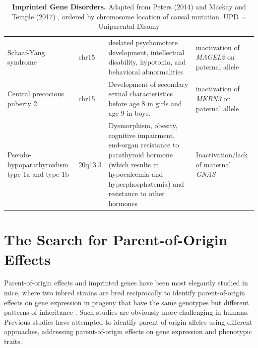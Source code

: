 \begin{table}[!htb]
\begin{adjustbox}{width=1\textwidth}
\begin{tabular}{@{}p{3cm}p{2cm}p{7cm}p{7cm}@{}}
Schaaf-Yang syndrome\cite{Fountain:2017dd} & chr15  & deelated psychomotore development, intellectual disability, hypotonia, and behavioral abnormalities & inactivation of \emph{MAGEL2} on paternal allele\\
Central precocious puberty 2\cite{Abreu:2013je} & chr15 & Development of secondary sexual characteristics before age 8 in girls and age 9 in boys. & inactivation of \emph{MKRN3} on paternal allele\\
Pseudo-hypoparathyroidism type 1a and type 1b\cite{Mantovani:2016em,Elli:2016et}  & 20q13.3 & Dysmorphism, obesity, cognitive impairment, end-organ resistance to parathyroid hormone (which results in hypocalcemia and hyperphosphatemia) and resistance to other hormones & Inactivation/lack of maternal \emph{GNAS} \\ 

\bottomrule
\end{tabular}
\end{adjustbox}
\caption[Imprinted Gene Disorders.]{\textbf{Imprinted Gene Disorders.} Adapted from Peters (2014) and Mackay and Temple (2017) \cite{Peters2014,Mackay:2017kn}, ordered by chromosome location of causal mutation. UPD = Uniparental Disomy}
\label{tab:imprinteddisease}
\end{table}


\section{The Search for Parent-of-Origin Effects}

Parent-of-origin effects and imprinted genes have been most elegantly studied in mice, where two inbred strains are bred reciprocally to identify parent-of-origin effects on gene expression in progeny that have the same genotypes but different patterns of inheritance \cite{Babak2012}. Such studies are obviously more challenging in humans. Previous studies have attempted to identify parent-of-origin alleles using different approaches, addressing parent-of-origin effects on gene expression and phenotypic traits.

